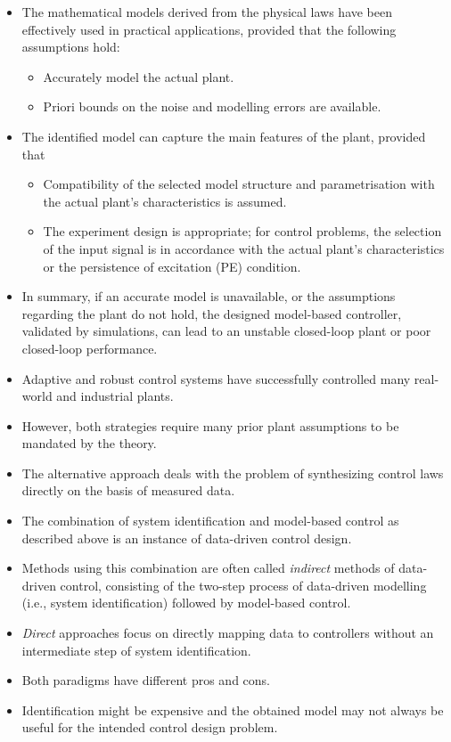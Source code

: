 \documentclass[hyperref={pdfpagemode=FullScreen},aspectratio=169]{beamer}
\begin{document}
\begin{frame}{}
\begin{itemize}
\setlength\itemsep{1em}
\item The mathematical models derived from the physical laws have been effectively used in practical applications, provided that the following assumptions hold:
\begin{itemize}\setlength\itemsep{1em}
\item Accurately model the actual plant.
\item Priori bounds on the noise and modelling errors are available.
\end{itemize}
\item The identified model can capture the main features of the plant, provided that
\begin{itemize}
\setlength\itemsep{1em}
\item Compatibility of the selected model structure and parametrisation with the actual plant's characteristics is assumed.
\item The experiment design is appropriate; for control problems, the selection of the input signal is in accordance with the actual plant's characteristics or the persistence of excitation (PE) condition.
\end{itemize}
\item  In summary, if an accurate model is unavailable, or the assumptions regarding the plant do not hold, the designed model-based controller, validated by simulations, can lead to an unstable closed-loop plant or poor closed-loop performance.
\item Adaptive and robust control systems have successfully controlled many real-world and industrial plants. 
\end{itemize}
\end{frame}
\begin{frame}{}
\begin{itemize}
\setlength\itemsep{1em}
\item However, both strategies require many prior plant assumptions to be mandated by the theory.
\item The alternative approach deals with the problem of synthesizing control laws directly on the basis of measured data.
\item The combination of system identification and model-based control as described above is an instance of data-driven control design.
\item Methods using this combination are often called \textit{indirect} methods of data-driven control, consisting of the two-step process of data-driven modelling (i.e., system identification) followed by model-based control.
\item \textit{Direct} approaches focus on directly mapping data to controllers without an intermediate step of system identification.
\item Both paradigms have different pros and cons.
\item Identification might be expensive and the obtained model may not always be useful for the intended control design problem.
\end{itemize}
\end{frame}
\end{document}
